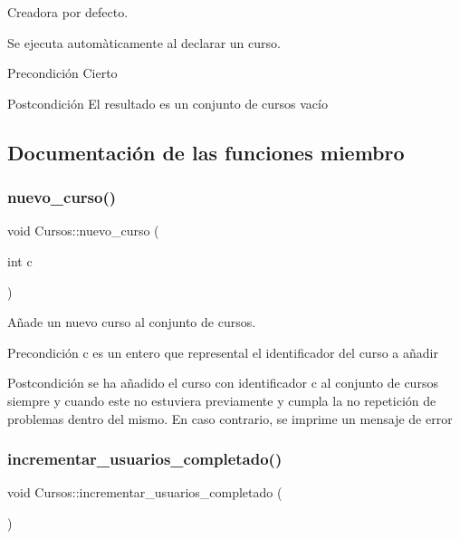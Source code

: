Creadora por defecto. 

Se ejecuta automàticamente al declarar un curso. \begin{DoxyPrecond}{Precondición}
Cierto 
\end{DoxyPrecond}
\begin{DoxyPostcond}{Postcondición}
El resultado es un conjunto de cursos vacío 
\end{DoxyPostcond}


\subsection{Documentación de las funciones miembro}
\mbox{\label{class_cursos_a64e6fd6a1d034b381b0377d098778dd9}} 
\subsubsection{\texorpdfstring{nuevo\+\_\+curso()}{nuevo\_curso()}}
{\footnotesize\ttfamily void Cursos\+::nuevo\+\_\+curso (\begin{DoxyParamCaption}\item[{int}]{c }\end{DoxyParamCaption})}



Añade un nuevo curso al conjunto de cursos. 

\begin{DoxyPrecond}{Precondición}
c es un entero que represental el identificador del curso a añadir 
\end{DoxyPrecond}
\begin{DoxyPostcond}{Postcondición}
se ha añadido el curso con identificador c al conjunto de cursos siempre y cuando este no estuviera previamente y cumpla la no repetición de problemas dentro del mismo. En caso contrario, se imprime un mensaje de error 
\end{DoxyPostcond}
\mbox{\label{class_cursos_a3ce8af0e0132939cf6f51a4321d58d7f}} 
\subsubsection{\texorpdfstring{incrementar\+\_\+usuarios\+\_\+completado()}{incrementar\_usuarios\_completado()}}
{\footnotesize\ttfamily void Cursos\+::incrementar\+\_\+usuarios\+\_\+completado (\begin{DoxyParamCaption}{ }\end{DoxyParamCaption})}



